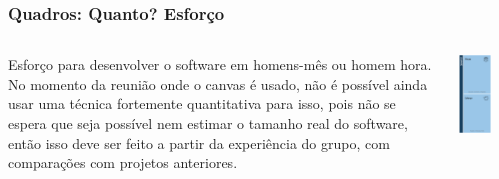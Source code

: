 \documentclass[aspectratio=169]{beamer}
\begin{document}
\begin{frame}
\frametitle{Quadros: Quanto? Esforço}
\begin{columns}
    \begin{column}{.66\textwidth}
Esforço para desenvolver o software em homens-mês ou homem hora. No momento da reunião onde o canvas é usado, não é possível ainda usar uma técnica fortemente quantitativa para isso, pois não se espera que seja possível nem estimar o tamanho real do software, então isso deve ser feito a partir da experiência do grupo, com comparações com projetos anteriores.
    \end{column}
    \begin{column}{.33\textwidth}
            \centering
    \includegraphics[width=0.6\textwidth]{detalhes/quanto.png}
    \end{column}
\end{columns} 
\end{frame}
\end{document}
